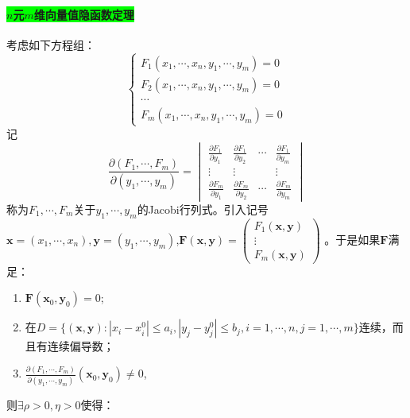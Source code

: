 \documentclass[UTF8]{ctexart}
\begin{document}
        \paragraph{\colorbox{lime}{$n$元$m$维向量值隐函数定理}}考虑如下方程组：
        $$\begin{cases}
            F_1(x_1,\cdots,x_n,y_1,\cdots,y_m)=0\\
            F_2(x_1,\cdots,x_n,y_1,\cdots,y_m)=0\\
            \cdots\\
            F_m(x_1,\cdots,x_n,y_1,\cdots,y_m)=0
        \end{cases}$$
        记
        $$\frac{\partial(F_1,\cdots,F_m)}{\partial(y_1,\cdots,y_m)}=\begin{vmatrix}
            \frac{\partial F_1}{\partial y_1}&\frac{\partial F_1}{\partial y_2}&\cdots &\frac{\partial F_1}{\partial y_m}\\
            \vdots&\vdots&&\vdots\\
            \frac{\partial F_m}{\partial y_1}&\frac{\partial F_m}{\partial y_2}&\cdots &\frac{\partial F_m}{\partial y_m}
        \end{vmatrix}$$
        称为$F_1,\cdots,F_m$关于$y_1,\cdots,y_m$的Jacobi行列式。引入记号$\boldsymbol{x}=(x_1,\cdots,x_n),\boldsymbol{y}=(y_1,\cdots,y_m)$,$\boldsymbol{F}(\boldsymbol{x},\boldsymbol{y})=\begin{pmatrix}
            F_1(\boldsymbol{x},\boldsymbol{y})\\
            \vdots\\
            F_m(\boldsymbol{x},\boldsymbol{y})
        \end{pmatrix}$
        。于是如果$\boldsymbol{F}$满足：
        \begin{enumerate}[(1)]
            \item $\boldsymbol{F}(\boldsymbol{x}_0,\boldsymbol{y}_0)=0$;\\
            \item 在$D=\{(\boldsymbol{x},\boldsymbol{y}):|x_i-x_i^0|\le a_i,|y_j-y_j^0|\le b_j,i=1,\cdots,n,j=1,\cdots,m\}$连续，而且有连续偏导数；
            \item $\frac{\partial(F_1,\cdots,F_m)}{\partial(y_1,\cdots,y_m)}(\boldsymbol{x}_0,\boldsymbol{y}_0)\not=0$,
        \end{enumerate}
        则$\exists\rho>0,\eta>0$使得：
\end{document}

